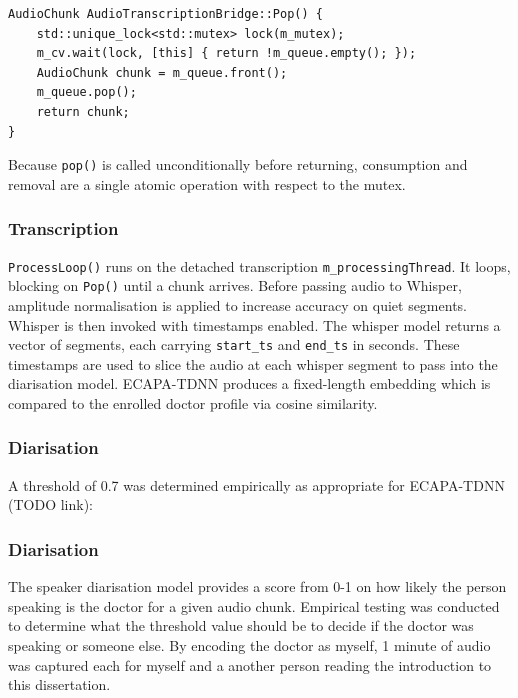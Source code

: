 \begin{verbatim}
AudioChunk AudioTranscriptionBridge::Pop() {
    std::unique_lock<std::mutex> lock(m_mutex);
    m_cv.wait(lock, [this] { return !m_queue.empty(); });
    AudioChunk chunk = m_queue.front();
    m_queue.pop();
    return chunk;
}
\end{verbatim}

Because \texttt{pop()} is called unconditionally before returning, consumption and removal are a single atomic operation with respect to the mutex. 

\subsubsection{Transcription}
\texttt{ProcessLoop()} runs on the detached transcription \texttt{m\_processingThread}. It loops, blocking on \texttt{Pop()} until a chunk arrives. Before passing audio to Whisper, amplitude normalisation is applied to increase accuracy on quiet segments. Whisper is then invoked with timestamps enabled. The whisper model returns a vector of segments, each carrying \texttt{start\_ts} and \texttt{end\_ts} in seconds. These timestamps are used to slice the audio at each whisper segment to pass into the diarisation model. ECAPA-TDNN produces a fixed-length embedding which is compared to the enrolled doctor profile via cosine similarity. 

\subsubsection{Diarisation}
A threshold of 0.7 was determined empirically as appropriate for ECAPA-TDNN (TODO link):

\subsubsection{Diarisation}
The speaker diarisation model provides a score from 0-1 on how likely the person speaking is the doctor for a given audio chunk. Empirical testing was conducted to determine what the threshold value should be to decide if the doctor was speaking or someone else. By encoding the doctor as myself, 1 minute of audio was captured each for myself and a another person reading the introduction to this dissertation. 

